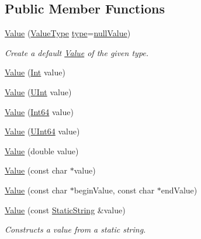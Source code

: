 \subsection*{Public Member Functions}
\begin{DoxyCompactItemize}
\item 
\hyperlink{class_json_1_1_value_ada6ba1369448fb0240bccc36efaa46f7}{Value} (\hyperlink{namespace_json_a7d654b75c16a57007925868e38212b4e}{Value\-Type} \hyperlink{class_json_1_1_value_a695ef31fad36b4712918b3ff80158479}{type}=\hyperlink{namespace_json_a7d654b75c16a57007925868e38212b4ea7d9899633b4409bd3fc107e6737f8391}{null\-Value})
\begin{DoxyCompactList}\small\item\em Create a default \hyperlink{class_json_1_1_value}{Value} of the given type. \end{DoxyCompactList}\item 
\hyperlink{class_json_1_1_value_a4744ae571fcf34f4b16a2257b3b3b585}{Value} (\hyperlink{class_json_1_1_value_abdf7a7ff73eb130ffcab28504ffdb405}{Int} value)
\item 
\hyperlink{class_json_1_1_value_ae67a857b01286e3499a87e95be848d20}{Value} (\hyperlink{class_json_1_1_value_a0933d59b45793ae4aade1757c322a98d}{U\-Int} value)
\item 
\hyperlink{class_json_1_1_value_ab1cdc3d9a4d4cc03fa01439d43ceb1b5}{Value} (\hyperlink{class_json_1_1_value_a1b86af9f85f0f1baa972c3319fa22695}{Int64} value)
\item 
\hyperlink{class_json_1_1_value_a8adda58d5ae17bf7ca6a53bab4a7b69c}{Value} (\hyperlink{class_json_1_1_value_a8b62564be8c087c6d18de180ff4e13e3}{U\-Int64} value)
\item 
\hyperlink{class_json_1_1_value_a32228cc84d83200cca8441451997996c}{Value} (double value)
\item 
\hyperlink{class_json_1_1_value_ad87b849356816aca75995dd07302e49d}{Value} (const char $\ast$value)
\item 
\hyperlink{class_json_1_1_value_a13e567d467bb1e699d71e27a76b0e988}{Value} (const char $\ast$begin\-Value, const char $\ast$end\-Value)
\item 
\hyperlink{class_json_1_1_value_a081830e95f88a37054da7e46c65b0766}{Value} (const \hyperlink{class_json_1_1_static_string}{Static\-String} \&value)
\begin{DoxyCompactList}\small\item\em Constructs a value from a static string. \end{DoxyCompactList}\item 

\end{DoxyCompactItemize}
